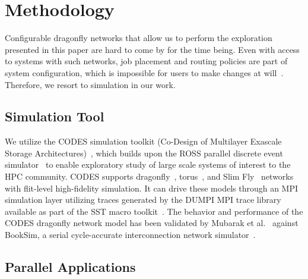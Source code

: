 

\section{Methodology}
\label{sec: methodology}

Configurable dragonfly networks that allow us to perform the exploration presented in this paper are hard to come by for the time being. Even with access to systems with such networks, job placement and routing policies are part of system configuration, which is impossible for users to make changes at will~\cite{jain-sc14, bhatele-sc11, zhou-ipdps-2015, jokanovic-ipdps-2015}. Therefore, we resort to simulation in our work.


\subsection{Simulation Tool}
\label{sec:simulation-tool}

We utilize the CODES simulation toolkit (Co-Design of Multilayer Exascale Storage Architectures)~\cite{misbah-tpds}, which builds upon the ROSS parallel discrete event simulator~\cite{carothers_ross:_2002,barnes_warp_2013} to enable exploratory study of large scale systems of interest to the HPC community. CODES supports dragonfly~\cite{codes-dragonfly, misbah-tpds}, torus~\cite{misbah-pads-2014, ning-pads-2011}, and Slim Fly~\cite{wolfe-pads-2016} networks with flit-level high-fidelity simulation. It can drive these models through an MPI simulation layer utilizing traces generated by the DUMPI MPI trace library available as part of the SST macro toolkit~\cite{sst}. 
The behavior and performance of the CODES dragonfly network model has been validated by Mubarak et al.\ \cite{codes-dragonfly} against BookSim, a serial cycle-accurate interconnection network simulator~\cite{booksim-simulator}.

\subsection{Parallel Applications}
\label{sec: application traces}



